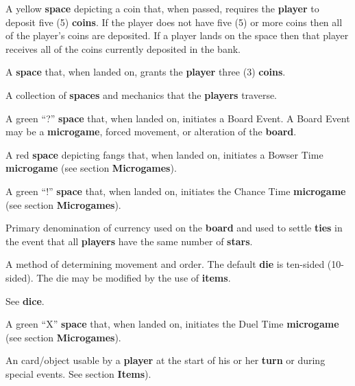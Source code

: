 \documentclass{article}
\begin{document}
\begin{description}[style=nextline]
\item[Bank Space] A yellow \textbf{space} depicting a coin that,
when passed, requires the \textbf{player} to deposit five (5) \textbf{coins}.
If the player does not have five (5) or more coins then all of the player's
coins are deposited.  If a player lands on the space then that player
receives all of the coins currently deposited in the bank.

\item[Blue Space] A \textbf{space} that, when landed on, grants the
\textbf{player} three (3) \textbf{coins}.

\item[Board] A collection of \textbf{spaces} and mechanics that the
\textbf{players} traverse.

\item[Board Event] A green ``?'' \textbf{space} that, when landed on,
initiates a Board Event.  A Board Event may be a \textbf{microgame},
forced movement, or alteration of the \textbf{board}.

\item[Bowser Space] A red \textbf{space} depicting fangs that,
when landed on, initiates a Bowser Time \textbf{microgame} (see
section \textbf{Microgames}).

\item[Chance Time] A green ``!'' \textbf{space} that, when landed on,
initiates the Chance Time \textbf{microgame} (see section
\textbf{Microgames}).

\item[Coin] Primary denomination of currency used on the \textbf{board}
and used to settle \textbf{ties} in the event that all \textbf{players}
have the same number of \textbf{stars}.

\item[Dice] A method of determining movement and order. The default
\textbf{die} is ten-sided (10-sided).  The die may be modified by the
use of \textbf{items}.

\item[Die] See \textbf{dice}.

\item[Duel Time] A green ``X'' \textbf{space} that, when landed on,
initiates the Duel Time \textbf{microgame} (see section \textbf{Microgames}).

\item[Item] An card/object usable by a \textbf{player} at the start of
his or her \textbf{turn} or during special events. See section \textbf{Items}).


\end{description}
\end{document}
